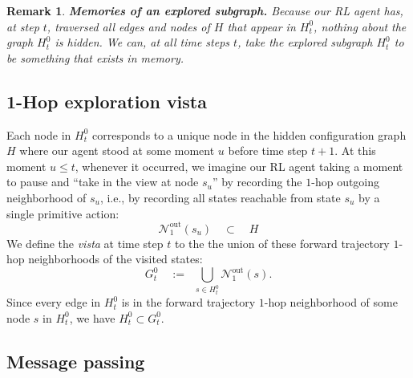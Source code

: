 \documentclass[11pt]{article}
\newtheorem{remark}{Remark}[subsection]
\begin{document}
\begin{remark}
{\bf Memories of an explored subgraph.}
\normalfont
Because our RL agent has, at step $t$, traversed all edges and nodes of $H$ that appear in $H^{0}_{t}$, nothing about the graph $H^{0}_{t}$ is hidden. We can, at all time steps $t$, take the explored subgraph $H^{0}_{t}$ to be something that exists in memory.
\end{remark}

\subsection{1-Hop exploration vista}
Each node in $H^{0}_{t}$ corresponds to a unique node in the hidden configuration graph $H$ where our agent stood at some moment $u$ before time step $t+1$. At this moment $u\le t$, whenever it occurred, we imagine our RL agent taking a moment to pause and ``take in the view at node $s_{u}$'' by recording the $1$-hop outgoing neighborhood of $s_{u}$, i.e., by recording all states reachable from state $s_{u}$ by a single primitive action:
$$
\mathcal{N}^{\text{out}\!}_{1}(s_{u})\quad\subset\quad H
$$
We define the {\em vista} at time step $t$ to the the union of these forward trajectory $1$-hop neighborhoods of the visited states:
$$
G^{0}_{t}
\quad:=\;\;
\bigcup_{s\in H^{0}_{t}}\!\mathcal{N}^{\text{out}\!}_{1}(s).
$$
Since every edge in $H^{0}_{t}$ is in the forward trajectory $1$-hop neighborhood of some node $s$ in $H^{0}_{t}$, we have $H^{0}_{t}\subset G^{0}_{t}$.

\subsection{Message passing}
\end{document}
